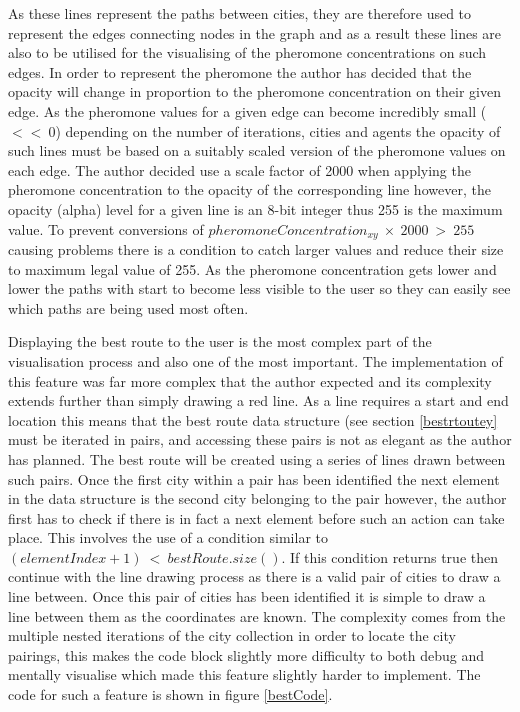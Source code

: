 As these lines represent the paths between cities, they are therefore used to represent the edges connecting nodes in the graph and as a result these lines are also to be utilised for the visualising of the pheromone concentrations on such edges. In order to represent the pheromone the author has decided that the opacity will change in proportion to the pheromone concentration on their given edge. As the pheromone values for a given edge can become incredibly small ($<<\ 0$) depending on the number of iterations, cities and agents the opacity of such lines must be based on a suitably scaled version of the pheromone values on each edge. The author decided use a scale factor of 2000 when applying the pheromone concentration to the opacity of the corresponding line however, the opacity (alpha) level for a given line is an 8-bit integer thus 255 is the maximum value. To prevent conversions of $pheromoneConcentration_{xy}\ \times\ 2000\ >\ 255$ causing problems there is a condition to catch larger values and reduce their size to maximum legal value of 255. As the pheromone concentration gets lower and lower the paths with start to become less visible to the user so they can easily see which paths are being used most often.

Displaying the best route to the user is the most complex part of the visualisation process and also one of the most important. The implementation of this feature was far more complex that the author expected and its complexity extends further than simply drawing a red line. As a line requires a start and end location this means that the best route data structure (see section \ref{bestrtoutey} must be iterated in pairs, and accessing these pairs is not as elegant as the author has planned. The best route will be created using a series of lines drawn between such pairs. Once the first city within a pair has been identified the next element in the data structure is the second city belonging to the pair however, the author first has to check if there is in fact a next element before such an action can take place. This involves the use of a condition similar to $(elementIndex + 1)\ <\ bestRoute.size()$. If this condition returns true then continue with the line drawing process as there is a valid pair of cities to draw a line between. Once this pair of cities has been identified it is simple to draw a line between them as the coordinates are known. The complexity comes from the multiple nested iterations of the city collection in order to locate the city pairings, this makes the code block slightly more difficulty to both debug and mentally visualise which made this feature slightly harder to implement. The code for such a feature is shown in figure \ref{bestCode}.

